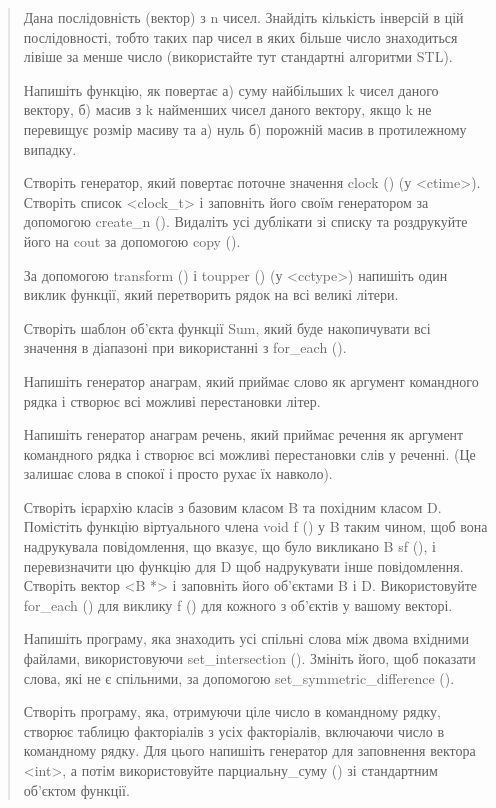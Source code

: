\documentclass[]{article}
\begin{document}
\begin{quote}
Дана послідовність (вектор) з n чисел. Знайдіть кількість інверсій в цій
послідовності, тобто таких пар чисел в яких більше число знаходиться
лівіше за менше число (використайте тут стандартні алгоритми STL).

\protect\hypertarget{_Hlk65952552}{}{}Напишіть функцію, як повертає а)
суму найбільших k чисел даного вектору, б) масив з k найменших чисел
даного вектору, якщо k не перевищує розмір масиву та а) нуль б) порожній
масив в протилежному випадку.

Створіть генератор, який повертає поточне значення clock () (у
\textless{}ctime\textgreater{}). Створіть список
\textless{}clock\_t\textgreater{} і заповніть його своїм генератором за
допомогою create\_n (). Видаліть усі дублікати зі списку та роздрукуйте
його на cout за допомогою copy ().

За допомогою transform () і toupper () (у
\textless{}cctype\textgreater{}) напишіть один виклик функції, який
перетворить рядок на всі великі літери.

Створіть шаблон об'єкта функції Sum, який буде накопичувати всі значення
в діапазоні при використанні з for\_each ().

Напишіть генератор анаграм, який приймає слово як аргумент командного
рядка і створює всі можливі перестановки літер.

Напишіть генератор анаграм речень, який приймає речення як аргумент
командного рядка і створює всі можливі перестановки слів у реченні. (Це
залишає слова в спокої і просто рухає їх навколо).

\protect\hypertarget{_Hlk65952580}{}{}

Створіть ієрархію класів з базовим класом B та похідним класом D.
Помістіть функцію віртуального члена void f () у B таким чином, щоб вона
надрукувала повідомлення, що вказує, що було викликано B sf (), і
перевизначити цю функцію для D щоб надрукувати інше повідомлення.
Створіть вектор \textless{}B *\textgreater{} і заповніть його об'єктами
B і D. Використовуйте for\_each () для виклику f () для кожного з
об'єктів у вашому векторі.

Напишіть програму, яка знаходить усі спільні слова між двома вхідними
файлами, використовуючи set\_intersection (). Змініть його, щоб показати
слова, які не є спільними, за допомогою set\_symmetric\_difference ().

Створіть програму, яка, отримуючи ціле число в командному рядку, створює
таблицю факторіалів з усіх факторіалів, включаючи число в командному
рядку. Для цього напишіть генератор для заповнення вектора
\textless{}int\textgreater{}, а потім використовуйте парциальну\_суму ()
зі стандартним об'єктом функції.


\end{quote}
\end{document}
